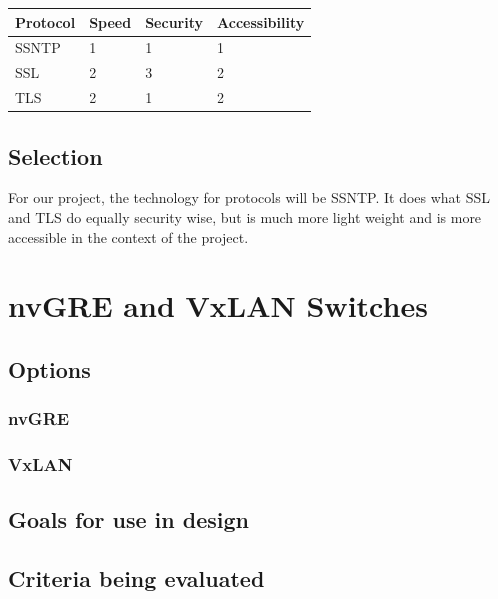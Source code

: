 \documentclass[10pt,letterpaper,onecolumn,draftclsnofoot]{IEEEtran}
\begin{document}
\begin{center}
	\begin{tabular}{| l | l | l | l |}
		\hline
		Protocol & Speed & Security & Accessibility \\ \hline
		SSNTP & 1 & 1 & 1 \\ \hline
		SSL & 2 & 3 & 2 \\ \hline
		TLS & 2 & 1 & 2 \\ \hline
	\end{tabular}
\end{center}

\subsection{Selection}
For our project, the technology for protocols will be SSNTP. It does what SSL
and TLS do equally security wise, but is much more light weight and is more
accessible in the context of the project.


\section{nvGRE and VxLAN Switches}

\subsection{Options}

\subsubsection{nvGRE}

\subsubsection{VxLAN}

\subsubsection{}

\subsection{Goals for use in design}

\subsection{Criteria being evaluated}
\end{document}

